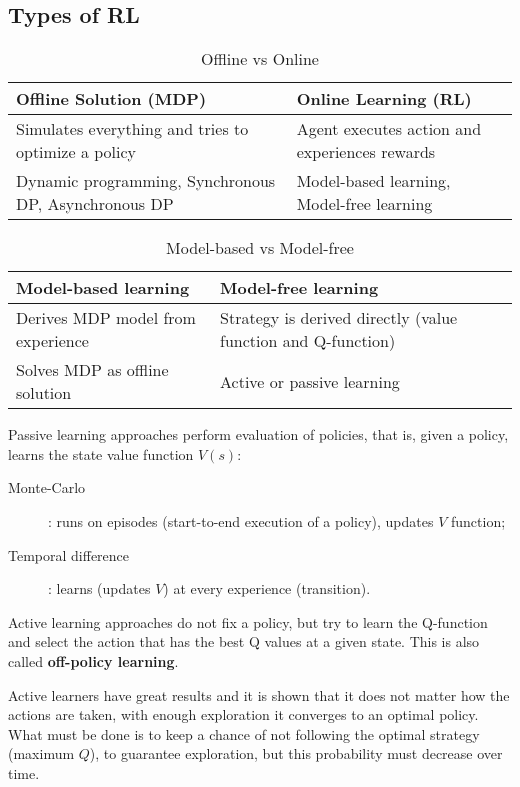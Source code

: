 \documentclass[a4paper]{report}
\begin{document}
\subsection*{Types of RL}

\begin{table}[H]
    \centering
    \caption{Offline vs Online}
    \label{tab:offline-online-rl}
    \begin{tabular}{l l}
    \toprule
    Offline Solution (MDP) & Online Learning (RL) \\
    \midrule
    Simulates everything and tries to optimize a policy & Agent executes action and experiences rewards  \\
    Dynamic programming, Synchronous DP, Asynchronous DP & Model-based learning, Model-free learning \\
    \bottomrule
    \end{tabular}
\end{table}

\begin{table}[H]
    \centering
    \caption{Model-based vs Model-free}
    \label{tab:model-based-free-rl}
    \begin{tabular}{l l}
    \toprule
    Model-based learning & Model-free learning \\
    \midrule
    Derives MDP model from experience & Strategy is derived directly (value function and Q-function) \\
    Solves MDP as offline solution & Active or passive learning \\
    \bottomrule
    \end{tabular}
\end{table}

Passive learning approaches perform evaluation of policies, that is, given a policy, learns the state value function $V(s)$:
\begin{description}
    \item[Monte-Carlo]: runs on episodes (start-to-end execution of a policy), updates $V$ function;
    \item[Temporal difference]: learns (updates $V$) at every experience (transition).
\end{description}

Active learning approaches do not fix a policy, but try to learn the Q-function and select the action that has the best Q values at a given state. This is also called \textbf{off-policy learning}.

Active learners have great results and it is shown that it does not matter how the actions are taken, with enough exploration it converges to an optimal policy. What must be done is to keep a chance of not following the optimal strategy (maximum $Q$), to guarantee exploration, but this probability must decrease over time.
\end{document}
